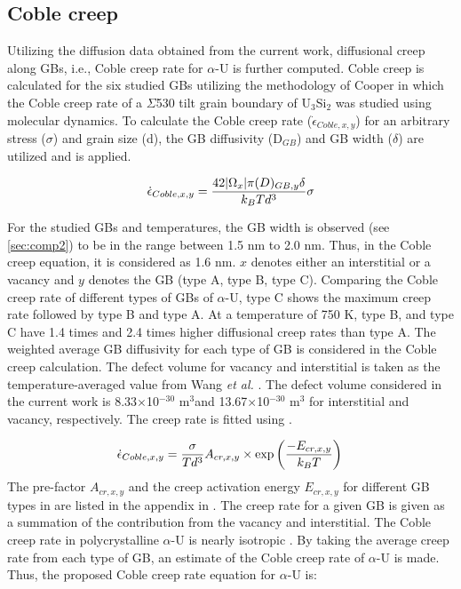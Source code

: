 \documentclass[review]{elsarticle}
\begin{document}
\subsection{Coble creep}

\par Utilizing the diffusion data obtained from the current work, diffusional creep along GBs, i.e., Coble creep \cite{coble} rate for $\alpha$-U is further computed. Coble creep is calculated for the six studied GBs utilizing the methodology of Cooper \cite{USi_diffusion} in which the Coble creep rate of a $\Sigma$530 tilt grain boundary of U$_\mathrm{3}$Si$_\mathrm{2}$ was studied using molecular dynamics. To calculate the Coble creep rate ($\dot{\epsilon}_{Coble,x,y}$) for an arbitrary stress ($\sigma$) and grain size (d), the GB diffusivity (D$_{GB}$) and GB width ($\delta$) are utilized and  is applied. 

\begin{equation}
\label{eq:coble}
\dot{\epsilon}_{Coble,x,y} =\frac{42 |\ohm_{x}| \pi (D )_{GB,y} \delta}{k_{B} T d^{3}} \sigma \\
\end{equation}

\noindent For the studied GBs and temperatures, the GB width is observed (see \cref{sec:comp2}) to be in the range between 1.5 nm to 2.0 nm. Thus, in the Coble creep equation, it is considered as 1.6 nm. $x$ denotes either an interstitial or a vacancy and $y$ denotes the GB (type A, type B, type C). Comparing the Coble creep rate of different types of GBs of $\alpha$-U, type C shows the maximum creep rate followed by type B and type A. At a temperature of 750 K, type B, and type C have 1.4 times and 2.4 times higher diffusional creep rates than type A. The weighted average GB diffusivity for each type of GB is considered in the Coble creep calculation. The defect volume for vacancy and interstitial is taken as the temperature-averaged value from Wang \textit{et al.} \cite{WANG2023154289}. The defect volume considered in the current work is 8.33$\times$10$^{-30}$ m$^\mathrm{3}$and 13.67$\times$10$^{-30}$ m$^\mathrm{3}$ for interstitial and vacancy, respectively. The creep rate is fitted using  \cite{USi_diffusion}. 

\begin{equation}
\label{eq:coble1}
\dot{\epsilon}_{Coble,x,y} =\frac{\sigma}{ T d^{3}} A_{cr,x,y} \times \exp\left(\frac{-E_{cr,x,y}}{k_{B} T}\right)\\
\end{equation}
% 
The pre-factor $A_{cr,x,y}$ and the creep activation energy $E_{cr,x,y}$ for different GB types in  are listed in the appendix in . The creep rate for a given GB is given as a summation of the contribution from the vacancy and interstitial. The Coble creep rate in polycrystalline $\alpha$-U is nearly isotropic \cite{calhoun}. By taking the average creep rate from each type of GB, an estimate of the Coble creep rate of $\alpha$-U is made. Thus, the proposed Coble creep rate equation for $\alpha$-U is:
\end{document}
